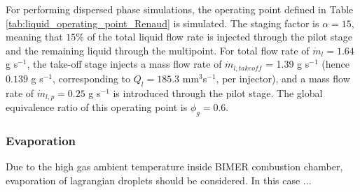 For performing dispersed phase simulations, the operating point defined in Table \ref{tab:liquid_operating_point_Renaud} is simulated. The staging factor is $\alpha = 15$, meaning that $15 \%$ of the total liquid flow rate is injected through the pilot stage and the remaining liquid through the multipoint. For total flow rate of $\dot{m}_l = 1.64$ g s$^{-1}$, the take-off stage injects a mass flow rate of $\dot{m}_{l,takeoff}$ = 1.39 g s$^{-1}$ (hence $0.139$ g s$^{-1}$, corresponding to $Q_l = 185.3$ mm$^3$s$^{-1}$,  per injector), and a mass flow rate of $\dot{m}_{l,p} = 0.25$ g s$^{-1}$ is introduced through the pilot stage. The global equivalence ratio of this operating point is $\phi_g = 0.6$.

\subsubsection*{Evaporation}

Due to the high gas ambient temperature inside BIMER combustion chamber, evaporation of lagrangian droplets should be considered. In this case ...


